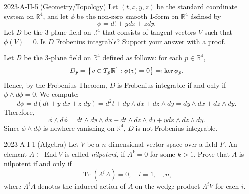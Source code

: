 \documentclass{article}
\begin{document}
\begin{prb}{2023-A-II-5 (Geometry/Topology)}
Let $(t, x, y, z)$ be the standard coordinate system on $\mathbb{R}^{4}$, and let $\phi$ be the non-zero smooth 1-form on $\mathbb{R}^{4}$ defined by 
	\begin{equation*}
		\phi = dt + ydx + zdy. 
	\end{equation*}
Let $D$ be the 3-plane field on $\mathbb{R}^{4}$ that consists of tangent vectors $V$ such that $\phi(V) = 0$. Is $D$ Frobenius integrable? Support your answer with a proof. 
\end{prb}
\begin{solutions}
	Let $D$ be the 3-plane field on $\mathbb{R}^{4}$  defined as follows: for each $p \in \mathbb{R}^{4}$, 
		\begin{equation}
			D_{p} = \brac*{v \in T_{p}\mathbb{R}^{4}: \phi(v) = 0} \eqqcolon \ker{\phi_{p}}. 
		\end{equation}
	Hence, by the Frobenius Theorem, $D$ is Frobenius integrable if and only if $\phi \wedge d\phi = 0$. We compute: 
		\begin{equation}
			d\phi = d(dt + y\;dx + z\;dy) = d^{2}t + dy \wedge dx + dz \wedge dy = dy \wedge dx + dz \wedge dy. 
		\end{equation}
	Therefore, 
		\begin{equation}
			\phi \wedge d\phi = dt \wedge dy \wedge dx + dt \wedge dz \wedge dy + y dx \wedge dz \wedge dy. 
		\end{equation}
	Since $\phi \wedge d\phi$ is nowhere vanishing on $\mathbb{R}^{4}$, $D$ is not Frobenius integrable. 
\end{solutions}
\begin{prb}{2023-A-I-1 (Algebra)}
	Let $V$ be a $n$-dimensional vector space over a field $F$. An element $A \in \operatorname{End}{V}$ is called \textit{nilpotent}, if $A^{k} = 0$ for some $k > 1$. Prove that $A$ is nilpotent if and only if 
		\begin{equation}
			\operatorname{Tr}(\Lambda^{i}A) = 0, \quad i = 1, \ldots, n,
		\end{equation} 
	where $\Lambda^{i}A$ denotes the induced action of $A$ on the wedge product $\Lambda^{i}V$ for each $i$. 
\end{prb}
\end{document}

